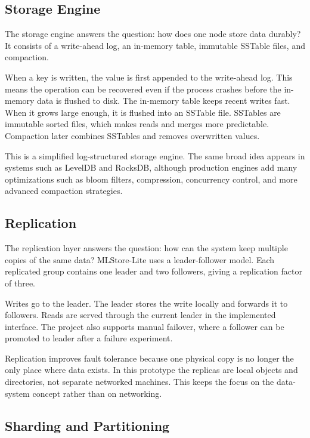 \subsection{Storage Engine}

The storage engine answers the question: how does one node store data durably?
It consists of a write-ahead log, an in-memory table, immutable SSTable files,
and compaction.

When a key is written, the value is first appended to the write-ahead log. This
means the operation can be recovered even if the process crashes before the
in-memory data is flushed to disk. The in-memory table keeps recent writes fast.
When it grows large enough, it is flushed into an SSTable file. SSTables are
immutable sorted files, which makes reads and merges more predictable.
Compaction later combines SSTables and removes overwritten values.

This is a simplified log-structured storage engine. The same broad idea appears
in systems such as LevelDB and RocksDB, although production engines add many
optimizations such as bloom filters, compression, concurrency control, and more
advanced compaction strategies.

\subsection{Replication}

The replication layer answers the question: how can the system keep multiple
copies of the same data? MLStore-Lite uses a leader-follower model. Each
replicated group contains one leader and two followers, giving a replication
factor of three.

Writes go to the leader. The leader stores the write locally and forwards it to
followers. Reads are served through the current leader in the implemented
interface. The project also supports manual failover, where a follower can be
promoted to leader after a failure experiment.

Replication improves fault tolerance because one physical copy is no longer the
only place where data exists. In this prototype the replicas are local objects
and directories, not separate networked machines. This keeps the focus on the
data-system concept rather than on networking.

\subsection{Sharding and Partitioning}

